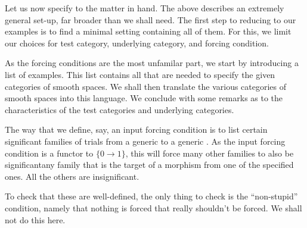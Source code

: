 \documentclass[%
a4paper,%
arxiv,%
defaults
]{myclass}
\begin{document}
Let us now specify to the matter in hand.
The above describes an extremely general set\hyp{}up, far broader than we shall need.
The first step to reducing to our examples is to find a minimal setting containing all of them.
For this, we limit our choices for test category, underlying category, and forcing condition.

As the forcing conditions are the most unfamilar part, we start by introducing a list of examples.
This list contains all that are needed to specify the given categories of smooth spaces.
We shall then translate the various categories of smooth spaces into this language.
We conclude with some remarks as to the characteristics of the test categories and underlying categories.

The way that we define, say, an input forcing condition is to list certain significant families of trials from a generic \tobj to a generic \uVtobj.
As the input forcing condition is a functor to \(\{0 \to 1\}\), this will force many other families to also be significant\emhyp{}any family that is the target of a morphism from one of the specified ones.
All the others are insignificant.

To check that these are well\hyp{}defined, the only thing to check is the ``non\hyp{}stupid'' condition, namely that nothing is forced that really shouldn't be forced.
We shall not do this here.
\end{document}
